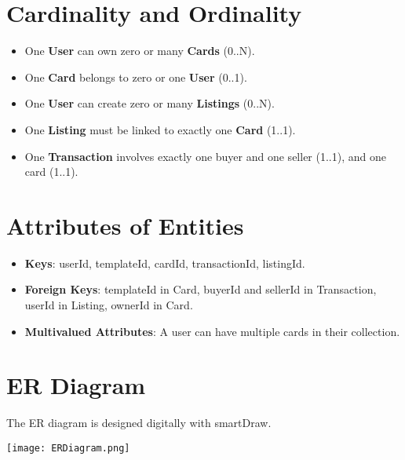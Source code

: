 \documentclass[13pt]{article}
\begin{document}
\section{Cardinality and Ordinality}
\begin{itemize}
    \item One \textbf{User} can own zero or many \textbf{Cards} (0..N).
    \item One \textbf{Card} belongs to zero or one \textbf{User} (0..1).
    \item One \textbf{User} can create zero or many \textbf{Listings} (0..N).
    \item One \textbf{Listing} must be linked to exactly one \textbf{Card} (1..1).
    \item One \textbf{Transaction} involves exactly one buyer and one seller (1..1), and one card (1..1).
\end{itemize}

\section{Attributes of Entities}
\begin{itemize}
    \item \textbf{Keys}: userId, templateId, cardId, transactionId, listingId.
    \item \textbf{Foreign Keys}: templateId in Card, buyerId and sellerId in Transaction, userId in Listing, ownerId in Card.
    \item \textbf{Multivalued Attributes}: A user can have multiple cards in their collection.
\end{itemize}

\section{ER Diagram}
The ER diagram is designed digitally with smartDraw.

\begin{center}
    \texttt{[image: ERDiagram.png]}
\end{center}
\end{document}
